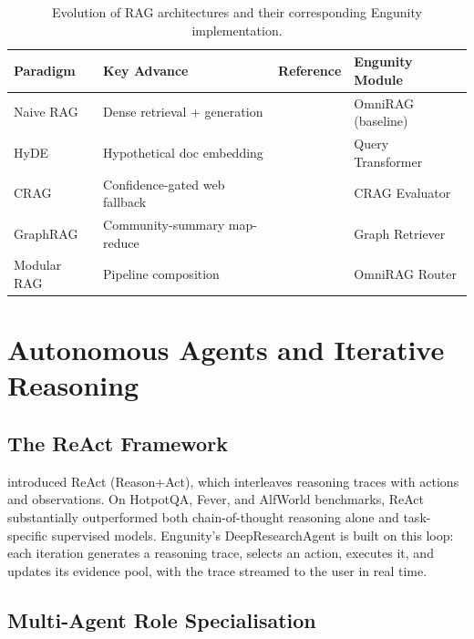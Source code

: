 \begin{table}[ht]
    \centering
    \caption{Evolution of RAG architectures and their corresponding Engunity implementation.}
    \label{tab:rag-evolution}
    \renewcommand{\arraystretch}{1.3}
    \begin{tabular}{p{3cm} p{3cm} p{2.5cm} p{2.5cm}}
        \toprule
        \textbf{Paradigm} & \textbf{Key Advance} & \textbf{Reference} & \textbf{Engunity Module} \\
        \midrule
        Naive RAG & Dense retrieval + generation & \citet{lewis2020rag} & OmniRAG (baseline) \\
        HyDE & Hypothetical doc embedding & \citet{gao2022precise} & Query Transformer \\
        CRAG & Confidence-gated web fallback & \citet{yan2024crag} & CRAG Evaluator \\
        GraphRAG & Community-summary map-reduce & \citet{edge2024local} & Graph Retriever \\
        Modular RAG & Pipeline composition & \citet{gao2023modularrag} & OmniRAG Router \\
        \bottomrule
    \end{tabular}
\end{table}

\section{Autonomous Agents and Iterative Reasoning}
\label{sec:agents-survey}

\subsection{The ReAct Framework}
\label{subsec:react}

\citet{yao2022react} introduced ReAct (Reason+Act), which interleaves reasoning traces with actions and observations. On HotpotQA, Fever, and AlfWorld benchmarks, ReAct substantially outperformed both chain-of-thought reasoning alone and task-specific supervised models. Engunity's DeepResearchAgent is built on this loop: each iteration generates a reasoning trace, selects an action, executes it, and updates its evidence pool, with the trace streamed to the user in real time.

\subsection{Multi-Agent Role Specialisation}
\label{subsec:autogen}

